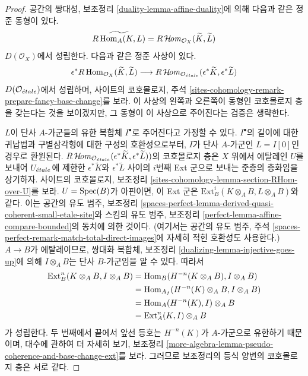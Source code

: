 \begin{proof}
공간의 쌍대성, 보조정리 \ref{duality-lemma-affine-duality}에 의해
다음과 같은 정준 동형이 있다.
$$
\widetilde{R\mathop{\mathrm{Hom}}\nolimits_A(K, L)} =
R\mathop{\mathcal{H}\!\mathit{om}}\nolimits_{\mathcal{O}_X}(\widetilde{K}, \widetilde{L})
$$
$D(\mathcal{O}_X)$에서 성립한다. 다음과 같은 정준 사상이 있다.
$$
\epsilon^*R\mathop{\mathrm{Hom}}\nolimits_{\mathcal{O}_X}(\widetilde{K}, \widetilde{L})
\longrightarrow
R\mathop{\mathcal{H}\!\mathit{om}}\nolimits_{\mathcal{O}_{\acute{e}tale}}(\epsilon^*\widetilde{K},
\epsilon^*\widetilde{L})
$$
$D(\mathcal{O}_{\acute{e}tale})$에서 성립하며, 사이트의 코호몰로지, 주석
\ref{sites-cohomology-remark-prepare-fancy-base-change}를 보라.
이 사상의 왼쪽과 오른쪽이 동형인 코호몰로지 층을 갖는다는 것을
보이겠지만, 그 동형이 이 사상으로 주어진다는 검증은 생략한다.

\medskip\noindent
$L$이 단사 $A$-가군들의 유한 복합체 $I^\bullet$로 주어진다고 가정할 수 있다.
$I^\bullet$의 길이에 대한 귀납법과 구별삼각형에 대한 구성의
호환성으로부터, $I$가 단사 $A$-가군인 $L = I[0]$인 경우로
환원된다.
$R\mathop{\mathcal{H}\!\mathit{om}}\nolimits_{\mathcal{O}_{\acute{e}tale}}(\epsilon^*\widetilde{K},
\epsilon^*\widetilde{L}))$의 코호몰로지 층은
$X$ 위에서 에탈레인 $U$를 보내어
$U_{\acute{e}tale}$에 제한한 $\epsilon^*\widetilde{K}$와
$\epsilon^*\widetilde{L}$ 사이의 $i$번째 Ext 군으로 보내는
준층의 층화임을 상기하자. 사이트의 코호몰로지, 보조정리
\ref{sites-cohomology-lemma-section-RHom-over-U}를 보라.
$U = \mathop{\mathrm{Spec}}(B)$가 아핀이면, 이 Ext 군은
$\text{Ext}^i_B(K \otimes_A B, L \otimes_A B)$와 같다. 이는 공간의 유도 범주, 보조정리
\ref{spaces-perfect-lemma-derived-quasi-coherent-small-etale-site}와
스킴의 유도 범주, 보조정리
\ref{perfect-lemma-affine-compare-bounded}의 동치에 의한 것이다.
(여기서는 공간의 유도 범주, 주석
\ref{spaces-perfect-remark-match-total-direct-images}에 자세히 적힌
호환성도 사용한다.)
$A \to B$가 에탈레이므로, 쌍대화 복합체, 보조정리
\ref{dualizing-lemma-injective-goes-up}에 의해
$I \otimes_A B$는 단사 $B$-가군임을 알 수 있다.
따라서
\begin{align*}
\mathop{\mathrm{Ext}}\nolimits^n_B(K \otimes_A B, I \otimes_A B)
& =
\mathop{\mathrm{Hom}}\nolimits_B(H^{-n}(K \otimes_A B), I \otimes_A B) \\
& =
\mathop{\mathrm{Hom}}\nolimits_{A_f}(H^{-n}(K) \otimes_A B, I \otimes_A B) \\
& =
\mathop{\mathrm{Hom}}\nolimits_A(H^{-n}(K), I) \otimes_A B \\
& =
\text{Ext}^n_A(K, I) \otimes_A B
\end{align*}
가 성립한다. 두 번째에서 끝에서 앞선 등호는 $H^{-n}(K)$가
$A$-가군으로 유한하기 때문이며, 대수에 관하여 더 자세히 보기,
보조정리 \ref{more-algebra-lemma-pseudo-coherence-and-base-change-ext}를
보라.
그러므로 보조정리의 등식 양변의 코호몰로지 층은 서로 같다.
\end{proof}

